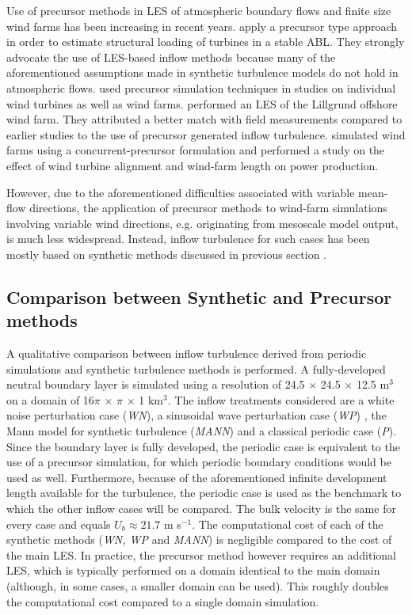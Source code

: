 	Use of precursor methods  in LES of atmospheric boundary flows and finite size wind farms has been increasing in recent years. \cite{park2014large} apply a precursor type approach in order to estimate structural loading of turbines in a stable ABL. They strongly advocate the use of LES-based inflow methods because many of the aforementioned assumptions made in synthetic turbulence models do not hold in atmospheric flows.
	\cite{wu2011large, wu2012atmospheric, wu2013simulation,  wu2015modeling} used precursor simulation techniques in studies on individual wind turbines as well as wind farms.
	\cite{churchfield2012large} performed an LES of the Lillgrund offshore wind farm. They attributed a better match with field measurements compared to earlier studies to the use of precursor generated inflow turbulence. \cite{stevens2014large, stevens2014concurrent} simulated wind farms using a concurrent-precursor formulation and performed a study on the effect of wind turbine alignment and wind-farm length on power production.  
	
	However, due to the aforementioned difficulties associated with variable mean-flow directions, the application of precursor methods to wind-farm simulations involving variable wind directions, e.g. originating from mesoscale model output, is much less widespread. Instead, inflow turbulence for such cases has been mostly based on synthetic methods discussed in previous section \citep{mirocha2013transition, mirocha2014resolved, munoz2015stochastic}.
	
	
	\subsection{Comparison between Synthetic and Precursor methods}\label{subsec:comparison}
	A qualitative comparison between inflow turbulence derived from periodic simulations and synthetic turbulence methods is performed. A fully-developed neutral boundary layer is simulated using a resolution of 24.5 $\times$ 24.5 $\times$ 12.5 m$^3$ on a domain of 16$\pi$ $\times$ $\pi$ $\times$ 1 km$^3$. The inflow treatments considered are a white noise perturbation case  (\emph{WN}), a sinusoidal wave perturbation case (\emph{WP}) , the Mann model for synthetic turbulence (\emph{MANN}) and a classical periodic case (\emph{P}). Since the boundary layer is fully developed, the periodic case is equivalent to the use of a precursor simulation, for which periodic boundary conditions would be used as well. Furthermore, because of the aforementioned infinite development length available for the turbulence, the periodic case is used as the benchmark to which the other inflow cases will be compared. The bulk velocity is the same for every case and equals $U_b \approx 21.7 $ m s$^{-1}$. The computational cost of each of the synthetic methods (\emph{WN, WP} and \emph{MANN}) is negligible compared to the cost of the main LES. In practice, the precursor method however requires an additional LES, which is typically performed on a domain identical to the main domain (although, in some cases, a smaller domain can be used). This roughly doubles the computational cost compared to a single domain simulation.
	
